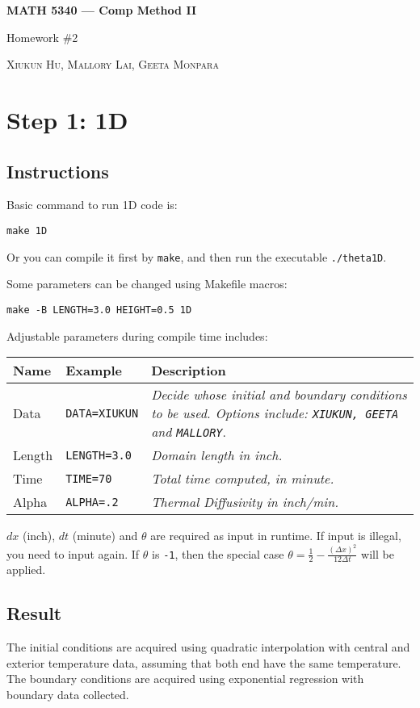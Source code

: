 \documentclass[letterpaper,12pt,fleqn]{article}
\newcommand{\mybox}[1]{\par\noindent\colorbox{shadecolor}
{\parbox{\dimexpr\textwidth-2\fboxsep\relax}{\tt #1}}}
\newcommand{\code}[1]{\colorbox{shadecolor}{\tt #1}}
\newcommand\f{\frac}
\begin{document}
\centerline{\bf \huge MATH 5340 --- Comp Method II}		%
\bigskip							%
\centerline{\Large Homework \#2} 				%
\medskip							%
\centerline{\textsc{Xiukun Hu, Mallory Lai, Geeta Monpara}}	%
\bigskip							%

\section{Step 1: 1D}
\subsection{Instructions}
Basic command to run 1D code is:
\mybox{make 1D}

Or you can compile it first by \code{make}, and then run the executable \code{./theta1D}\;.

Some parameters can be changed using Makefile macros:
\mybox{make -B LENGTH=3.0 HEIGHT=0.5 1D}

Adjustable parameters during compile time includes:
\begin{table}[h]
  \begin{tabular}{p{2cm} p{3.3cm} p{7cm}}
    \toprule
    \textbf{Name} & \textbf{Example} & \textbf{Description}\\
    \midrule
    Data    &	\code{DATA=XIUKUN}    &	  \textit{Decide whose initial and boundary conditions to be used.
      Options include:
  \texttt{XIUKUN, GEETA} and \texttt{MALLORY}}.\\
    Length  &	\code{LENGTH=3.0}     &	  \textit{Domain length in inch.}\\
    Time    &	\code{TIME=70}	      &	  \textit{Total time computed, in minute.}\\
    Alpha   &	\code{ALPHA=.2}	      &	  \textit{Thermal Diffusivity in inch/min.}\\
    \bottomrule
  \end{tabular}
\end{table}

$dx$ (inch), $dt$ (minute) and $\theta$ are required as input in runtime.
If input is illegal, you need to input again.
If $\theta$ is \code{-1}, then the special case
$\theta=\f12 -\frac{(\Delta x)^2}{12\Delta t}$
will be applied.

\subsection{Result}
The initial conditions are acquired using quadratic interpolation
with central and exterior temperature data,
assuming that both end have the same temperature.
The boundary conditions are acquired using exponential regression with boundary data collected.
\end{document}
